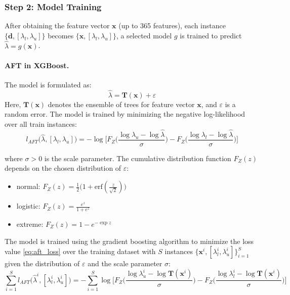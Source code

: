\documentclass[12pt]{article}
\begin{document}
\subsubsection{Step 2: Model Training}
After obtaining the feature vector $\mathbf{x}$ (up to 365 features), each instance $\{\mathbf{d}, [\lambda_l, \lambda_u]\}$ becomes $\{\mathbf{x}, [\lambda_l, \lambda_u]\}$, a selected model $g$ is trained to predict $\hat{\lambda} = g(\mathbf{x})$.

\paragraph{AFT in XGBoost.} The model is formulated as:
\begin{equation*}
    \hat{\lambda} = \mathbf{T}(\mathbf{x}) + \varepsilon
\end{equation*}
Here, $\mathbf{T}(\mathbf{x})$ denotes the ensemble of trees for feature vector $\mathbf{x}$, and $\varepsilon$ is a random error. 
The model is trained by minimizing the negative log-likelihood over all train instances:
\begin{equation} \label{eq:aft_loss}
    l_{AFT}\Big(\hat{\lambda}, [\lambda_l, \lambda_u]\Big) = -\log \Big[ F_Z\big( \frac{\log\lambda_u - \log\hat{\lambda}}{\sigma} \big) - F_Z\big(\frac{\log\lambda_l - \log\hat{\lambda}}{\sigma}\big) \Big]
\end{equation}

\noindent where $\sigma > 0$ is the scale parameter.
The cumulative distribution function $F_Z(z)$ depends on the chosen distribution of $\varepsilon$:
\begin{itemize}
    \item normal: \phantom{00}   $F_Z(z) = \frac{1}{2}\big( 1 + \text{erf}(\frac{z}{\sqrt{2}}) \big)$
    \item logistic: \phantom{00} $F_Z(z) = \frac{e^z}{1+e^z}$
    \item extreme: \phantom{0} $F_Z(z) = 1 - e^{-\exp z}$
\end{itemize}
The model is trained using the gradient boosting algorithm \citep{gradient_boosting} to minimize the loss value \eqref{eq:aft_loss} over the training dataset with $S$ instances $\{\mathbf{x}^i, [\lambda_l^i, \lambda_u^i]\}_{i=1}^S$ given the distribution of $\varepsilon$ and the scale parameter $\sigma$:
\begin{equation*}
    \sum_{i = 1}^S l_{AFT}\Big(\hat{\lambda}^i, [\lambda_l^i, \lambda_u^i]\Big) = -\sum_{i=1}^S \log \Big[ F_Z\big( \frac{\log\lambda_u^i - \log\mathbf{T}(\mathbf{x}^i)}{\sigma} \big) - F_Z\big(\frac{\log\lambda_l^i - \log\mathbf{T}(\mathbf{x}^i)}{\sigma}\big) \Big]
\end{equation*}
\end{document}
